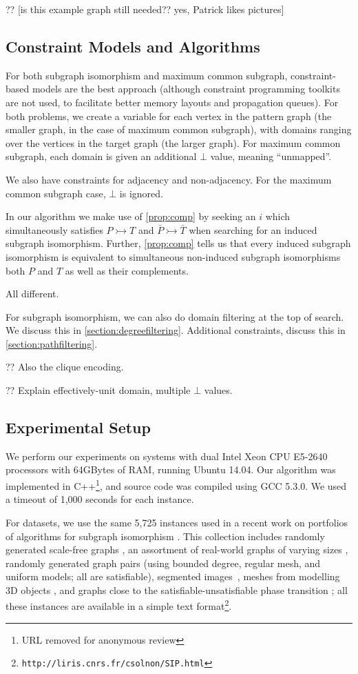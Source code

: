 \documentclass[letterpaper]{article}
\theoremstyle{definition}
\newcommand{\todo}[1]{{\color{red} {?? [}{#1}{]}}}
\begin{document}
\todo{is this example graph still needed?? yes, Patrick likes pictures}

\subsection{Constraint Models and Algorithms}

For both subgraph isomorphism and maximum common subgraph, constraint-based models are the best
approach (although constraint programming toolkits are not used, to facilitate better memory layouts
and propagation queues). For both problems, we create a variable for each vertex in the pattern
graph (the smaller graph, in the case of maximum common subgraph), with domains ranging over the
vertices in the target graph (the larger graph). For maximum common subgraph, each domain is given
an additional $\bot$ value, meaning ``unmapped''.

We also have constraints for adjacency and non-adjacency. For the maximum common subgraph case,
$\bot$ is ignored.

In our algorithm we make use of \cref{prop:comp} by seeking an $i$ which simultaneously satisfies $P
\rightarrowtail T$ and $\bar{P} \rightarrowtail \bar{T}$ when searching for an induced subgraph
isomorphism.  Further, \cref{prop:comp} tells us that every induced subgraph isomorphism is
equivalent to simultaneous non-induced subgraph isomorphisms both $P$ and $T$ as well as their
complements.

All different.

For subgraph isomorphism, we can also do domain filtering at the top of search. We discuss this in
\cref{section:degreefiltering}. Additional constraints, discuss this in \cref{section:pathfiltering}.

?? Also the clique encoding.

?? Explain effectively-unit domain, multiple $\bot$ values.

\subsection{Experimental Setup}

We perform our experiments on systems with dual Intel Xeon CPU E5-2640 processors with 64GBytes of
RAM, running Ubuntu 14.04. Our algorithm was implemented in C++\footnote{URL removed for anonymous
review}, and source code was compiled using
GCC 5.3.0. We used a timeout of 1,000 seconds for each instance.

For datasets, we use the same 5,725 instances used in a recent work on portfolios of algorithms for
subgraph isomorphism \cite{thelionpaper}. This collection includes randomly generated scale-free
graphs \cite{constraints10}, an assortment of real-world graphs of varying sizes \cite{LV02},
randomly generated graph pairs (using bounded degree, regular mesh, and uniform models; all are
satisfiable), segmented images~\cite{pr15,cviu11}, meshes from modelling 3D objects \cite{cviu11},
and graphs close to the satisfiable-unsatisfiable phase transition
\cite{DBLP:conf/ijcai/McCreeshPT16}; all these instances are available in a simple text
format\footnote{\texttt{http://liris.cnrs.fr/csolnon/SIP.html}}.
\end{document}
